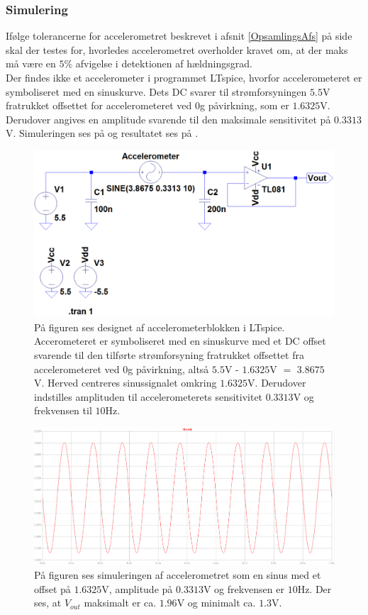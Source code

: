 \subsubsection{Simulering}
Ifølge tolerancerne for accelerometret beskrevet i afsnit \ref{OpsamlingsAfs} på side \pageref{OpsamlingsAfs} skal der testes for, hvorledes accelerometret overholder kravet om, at der maks må være en $5\%$ afvigelse i detektionen af hældningsgrad. \\
Der findes ikke et accelerometer i programmet LTspice, hvorfor accelerometeret er symboliseret med en sinuskurve. Dets DC svarer til strømforsyningen $5.5$V fratrukket offsettet for accelerometeret ved $0$g påvirkning, som er $1.6325$V. Derudover angives en amplitude svarende til den maksimale sensitivitet på $0.3313$V. Simuleringen ses på  og resultatet ses på .
\begin{figure}[H]
	\centering
	\includegraphics[scale=.4]{figures/cProblemloesning/Acc_Simulering1.PNG}
	\caption{På figuren ses designet af accelerometerblokken i LTspice. Accerometeret er symboliseret med en sinuskurve med et DC offset svarende til den tilførte strømforsyning fratrukket offsettet fra accelerometeret ved $0$g påvirkning, altså $5.5$V - $1.6325$V $=$ $3.8675$V. Herved centreres sinussignalet omkring $1.6325$V. Derudover indstilles amplituden til accelerometerets sensitivitet $0.3313$V og frekvensen til $10$Hz.}
	\label{fig:acc_simulering}
\end{figure}
\begin{figure}[H]
	\centering
	\includegraphics[scale=.35]{figures/cProblemloesning/Acc_Simulering2.PNG}
	\caption{På figuren ses simuleringen af accelerometret som en sinus med et offset på $1.6325$V, amplitude på $0.3313$V og frekvensen er $10$Hz. Der ses, at $V_{out}$ maksimalt er ca. $1.96$V og minimalt ca. $1.3$V.}
	\label{fig:acc_simulering_resultat}
\end{figure}

